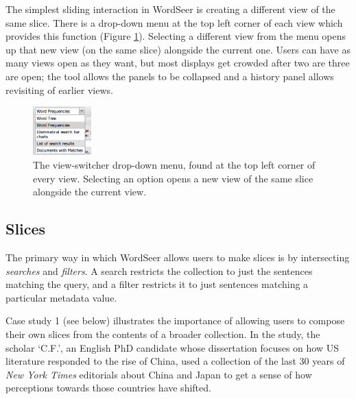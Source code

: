 \documentclass{sig-alternate}
\begin{document}
The simplest sliding interaction in WordSeer is creating a different view of the same slice.  There is a drop-down menu at the top left corner of each view which provides this function (Figure \ref{fig:chris03}).  Selecting a different view from the menu opens up that new view (on the same slice) alongside the current one. Users can have as many views open as they want, but most displays get crowded after two are three are open; the tool allows the panels to be collapsed and a history panel allows revisiting of earlier views.  
\begin{figure}[h!]
\includegraphics[width=0.2\textwidth]{fig/chris/03.png}
\caption{ The view-switcher drop-down menu, found at the top left corner of every view. Selecting an option opens a new view  of the same slice alongside the current view. \label{fig:chris03}}
\end{figure}

\subsection{Slices}

The primary way in which WordSeer allows users to make slices is by intersecting \emph{searches} and \emph{filters}.  A search restricts the collection to just the sentences matching the query, and a filter restricts it to just sentences matching a particular metadata value. 

Case study 1 (see below) illustrates the importance of allowing users to compose their own slices from the contents of a  broader collection. In the study, the scholar `C.F.', an English PhD candidate whose dissertation focuses on how US literature responded to the rise of China, used a collection of  the last 30 years of \emph{New York Times} editorials about China and Japan to get a sense of how perceptions towards those countries have shifted.
\end{document}
